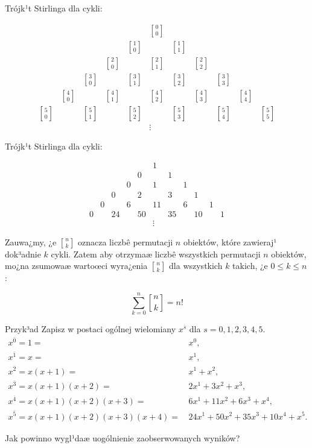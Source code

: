 \documentclass[a4paper,10pt]{beamer}
\begin{document}
\begin{frame}
Trójk¹t Stirlinga dla cykli:

$$\begin{array}{ccccccccccc}
&&&&&{0\brack0}&&&&&\\
&&&&{1\brack0}&&{1\brack1}&&&&\\
&&&{2\brack0}&&{2\brack1}&&{2\brack2}&&&\\
&&{3\brack0}&&{3\brack1}&&{3\brack2}&&{3\brack3}&&\\
&{4\brack0}&&{4\brack1}&&{4\brack2}&&{4\brack3}&&{4\brack4}&\\
{5\brack0}&&{5\brack1}&&{5\brack2}&&{5\brack3}&&{5\brack4}&&{5\brack5}\\
&&&&&\vdots&&&&&
\end{array}$$

\bigskip

Trójk¹t Stirlinga dla cykli:

$$\begin{array}{ccccccccccc}
&&&&&1&&&&&\\
&&&&0&&1&&&&\\
&&&0&&1&&1&&&\\
&&0&&2&&3&&1&&\\
&0&&6&&11&&6&&1&\\
0&&24&&50&&35&&10&&1\\
&&&&&\vdots&&&&&
\end{array}
$$
\end{frame}




\begin{frame}
Zauwa¿my, ¿e $\displaystyle {n\brack k}$ oznacza liczbê permutacji $n$ obiektów, które zawieraj¹ dok³adnie $k$ cykli. Zatem aby otrzymaæ liczbê wszystkich permutacji $n$ obiektów, mo¿na zsumowaæ wartoœci wyra¿enia $\displaystyle {n\brack k}$ dla wszystkich $k$ takich, ¿e $0\leqslant k\leqslant n$:

\begin{block}{}
$$\sum\limits_{k=0}^n{n\brack k}=n!$$
\end{block}
\end{frame}


\begin{frame}

\begin{exampleblock}{Przyk³ad}
Zapisz w postaci ogólnej wielomiany $x^{\overline{s}}$ dla $s=0,1,2,3,4,5$.
\begin{align*}
x^{\overline0}=1=&\,x^0,\\
x^{\overline1}=x=&\,x^1,\\
x^{\overline2}=x(x+1)=&\,x^1+x^2,\\
x^{\overline3}=x(x+1)(x+2)=&\,2x^1+3x^2+x^3,\\
x^{\overline4}=x(x+1)(x+2)(x+3)=&\,6x^1+11x^2+6x^3+x^4,\\
x^{\overline5}=x(x+1)(x+2)(x+3)(x+4)=&\,24x^1+50x^2+35x^3+10x^4+x^5.
\end{align*}
\end{exampleblock}

\bigskip

Jak powinno wygl¹daæ uogólnienie zaobserwowanych wyników?

\end{frame}
\end{document}
